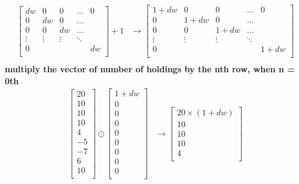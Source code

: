 \documentclass[a4paper,11pt]{article}
\begin{document}
\begin{flushleft}
\begin{itemize}
\begin{align*}
\begin{bmatrix} 
dw	&	0	&	0	&	\ldots	&	0 \\
0		& 	dw&	0	&	\ldots\\
0		&	0	&	dw&	\ldots\\
\vdots		&	\vdots	&	\vdots	&	\ddots\\
0 & & & & dw \\
 \end{bmatrix} + 1 
 &\rightarrow 
 \begin{bmatrix} 
1 + dw	&	0	&	0	&	\ldots	&	0 \\
0		& 	1 + dw &	0	&	\ldots\\
0		&	0	&	1 + dw&	\ldots\\
\vdots		&	\vdots	&	\vdots	&	\ddots\\
0 & & & &1 + dw\\ 
\end{bmatrix}\\
\end{align*}
\textbf{multiply the vector of number of holdings by the nth row, when n = 0th}\\
\begin{align*}
\begin{bmatrix} 
20 \\
10 \\
10 \\
10 \\
4 \\
-5 \\
-7\\
6 \\
10\\
\end{bmatrix} \odot 
\begin{bmatrix} 
1 + dw \\
0	\\
0	\\
0	\\
0	\\
0	\\
0	\\
0 	\\
0	\\
\end{bmatrix} 
& \rightarrow 
\begin{bmatrix}
20 \times \left( 1 + dw \right) \\
10 \\
10 \\
10 \\
4 \\

\end{bmatrix}
\end{align*}
\end{itemize}
\end{flushleft}
\end{document}
